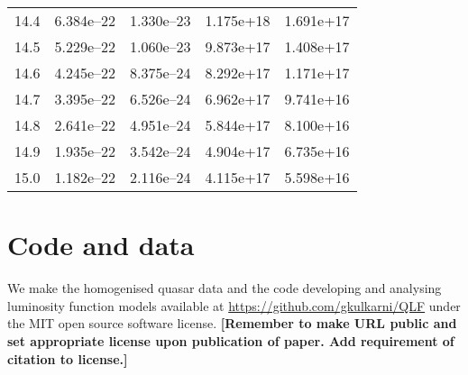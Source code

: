 \documentclass[a4paper,fleqn,usenatbib]{mnras}
\newcommand{\gk}[1]{{\bf \color{notecolor} [#1]}}
\begin{document}
\begin{table*}
\begin{tabular}{ccccc}
    14.4 & 6.384e--22 & 1.330e--23 & 1.175e+18 & 1.691e+17 \\
    14.5 & 5.229e--22 & 1.060e--23 & 9.873e+17 & 1.408e+17 \\
    14.6 & 4.245e--22 & 8.375e--24 & 8.292e+17 & 1.171e+17 \\
    14.7 & 3.395e--22 & 6.526e--24 & 6.962e+17 & 9.741e+16 \\
    14.8 & 2.641e--22 & 4.951e--24 & 5.844e+17 & 8.100e+16 \\
    14.9 & 1.935e--22 & 3.542e--24 & 4.904e+17 & 6.735e+16 \\
    15.0 & 1.182e--22 & 2.116e--24 & 4.115e+17 & 5.598e+16 \\
    \hline
  \end{tabular}
\end{table*}

\section{Code and data}

We make the homogenised quasar data and the code developing and
analysing luminosity function models available at
\url{https://github.com/gkulkarni/QLF} under the MIT open source
software license.  \gk{Remember to make URL public and set appropriate
  license upon publication of paper.  Add requirement of citation to
  license.}




\bsp
\label{lastpage}
\end{document}
